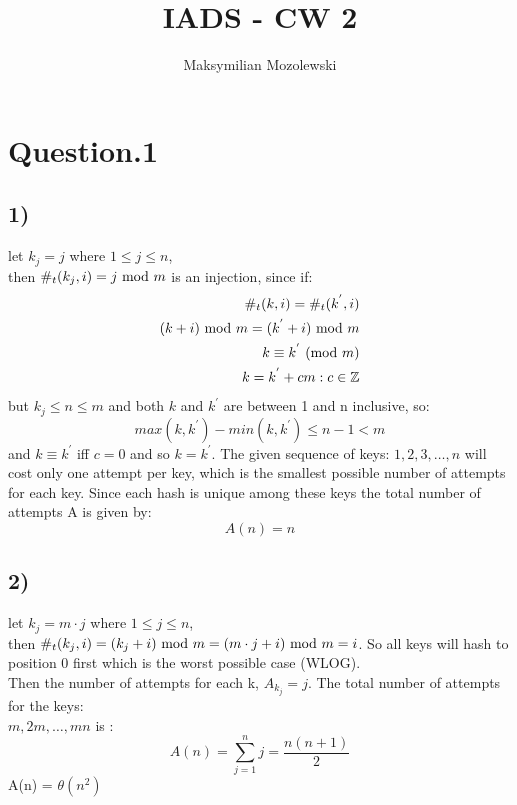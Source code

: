 \documentclass{report}
\begin{document}
\title{IADS - CW 2}
\author{Maksymilian Mozolewski}
\maketitle
\pagebreak

\section*{Question.1}
\subsection*{1)}
let $k_{j} = j$ where $ 1 \leq j \leq n$,\medskip\\
then $\#_{t}(k_{j},i) = j \ \mathrm{mod}\ m$ is an injection, since if:
\begin{align*}
    \#_{t}(k,i) = \#_{t}(k^{'},i)\\
    (k + i) \ \mathrm{mod}\ m = (k^{'} + i) \ \mathrm{mod}\ m\\
    k \equiv k^{'} \ (\mathrm{mod}\ m)\\
    k = k^{'} + cm : c \in \mathbb{Z}
\end{align*}
but $k_{j} \leq n \leq m$ and both $k$ and $k^{'}$ are between 1 and n inclusive, so: 
\begin{equation*}
    max(k,k^{'}) - min(k,k^{'}) \leq n-1 < m
\end{equation*}
and $k \equiv k^{'}$ iff  $c = 0$ and so $k = k^{'}$. The given sequence of keys: $1,2,3,\hdots,n$ will cost only one attempt per key, which is the smallest possible number of attempts for each key. Since each hash is unique among these keys the total number of attempts A is given by: 
\begin{equation*}
    A(n) = n
\end{equation*}

\subsection*{2)}

let $k_{j} = m\cdot j$ where $ 1 \leq j \leq n$,\medskip\\
then $\#_{t}(k_{j},i) = (k_{j} + i) \ \mathrm{mod}\ m = (m \cdot j + i) \ \mathrm{mod}\ m = i$. So all keys will hash to position 0 first which is the worst possible case (WLOG).\\
Then the number of attempts for each k, $A_{k_{j}} = j$. The total number of attempts for the keys:\\ $m,2m,\hdots,mn$ is :
\begin{equation*}
    A(n) = \sum_{j=1}^{n} j = \frac{n(n+1)}{2}
\end{equation*}
A(n) = $\theta(n^{2})$
\end{document}
